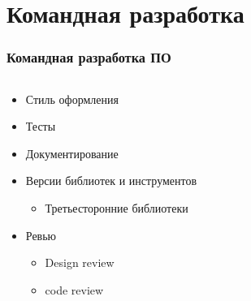 \documentclass{../../slides-style}
\begin{document}
    \section{Командная разработка}

    \begin{frame}
        \frametitle{Командная разработка ПО}
        \begin{columns}
            \begin{column}{0.6\textwidth}
                \begin{itemize}
                    \item Стиль оформления
                    \item Тесты
                    \item Документирование
                    \item Версии библиотек и инструментов
                    \begin{itemize}
                        \item Третьесторонние библиотеки
                    \end{itemize}
                    \item Ревью
                    \begin{itemize}
                        \item Design review
                        \item code review
                    \end{itemize}
                \end{itemize}
            \end{column}
            \begin{column}{0.4\textwidth}
                \begin{center}

\end{center}
\end{column}
\end{columns}
\end{frame}
\end{document}
